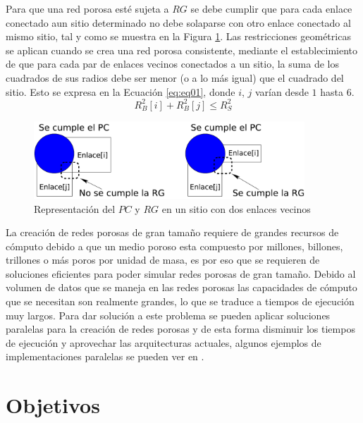 Para que una red porosa est\'e sujeta a $RG$ se debe cumplir que para cada enlace conectado aun sitio determinado no debe solaparse con otro enlace conectado al mismo sitio, tal y como se muestra en la Figura \ref{fig:CPyGR}. Las restricciones geométricas se aplican cuando se crea una red porosa consistente, mediante el establecimiento de que para cada par de enlaces vecinos conectados a un sitio, la suma de los cuadrados de sus radios debe ser menor (o a lo más igual) que el cuadrado del sitio. Esto se expresa en la Ecuación \ref{eq:eq01}, donde $i$, $j$ varían desde $1$ hasta $6$.\\

\begin{equation}
R_{B}^2[i]+R_{B}^2[j] \leq R_{S}^2
\label{eq:eq01}
\end{equation}

\begin{figure}[hbtp]
\centering
\includegraphics[width=4.0in]{img/CPyGC_es.pdf}
\caption{Representación del $PC$ y $RG$ en un sitio con dos enlaces vecinos}
\label{fig:CPyGR}
\end{figure}

La creación de redes porosas de gran tamaño requiere de grandes recursos de cómputo debido a que un medio poroso esta compuesto por millones, billones, trillones o más poros por unidad de masa, es por eso que se requieren de soluciones eficientes  para poder simular redes porosas de gran tamaño. Debido al volumen de datos que se maneja en las redes porosas las capacidades de cómputo que se necesitan son realmente grandes, lo que se traduce a tiempos de ejecución muy largos. Para dar solución a este problema se pueden aplicar soluciones paralelas para la creación de redes porosas y de esta forma disminuir los tiempos de ejecución y aprovechar las arquitecturas actuales, algunos ejemplos de implementaciones paralelas se pueden ver en \cite{ref4}.\\

\chapter{Objetivos}
\label{champ:objetivos}
\bigskip
\barra
\bigskip



